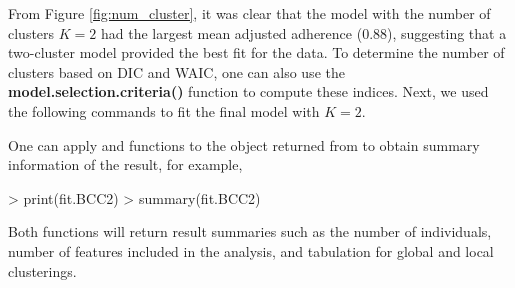 From Figure \ref{fig:num_cluster}, it was clear that the model with the number of clusters $K=2$ had the largest mean adjusted adherence (0.88), suggesting that a two-cluster model provided the best fit for the data. To determine the number of clusters based on DIC and WAIC, one can also use the \textbf{model.selection.criteria()} function to compute these indices.
Next, we used the following commands to fit the final model with $K=2$. 
One can apply  and  functions to the object returned from  to obtain summary information of the result, for example, 
\begin{example}
> print(fit.BCC2)
> summary(fit.BCC2)
\end{example} 
Both functions will return result summaries such as the number of individuals, number of features included in the analysis, and tabulation for global and local clusterings. 
